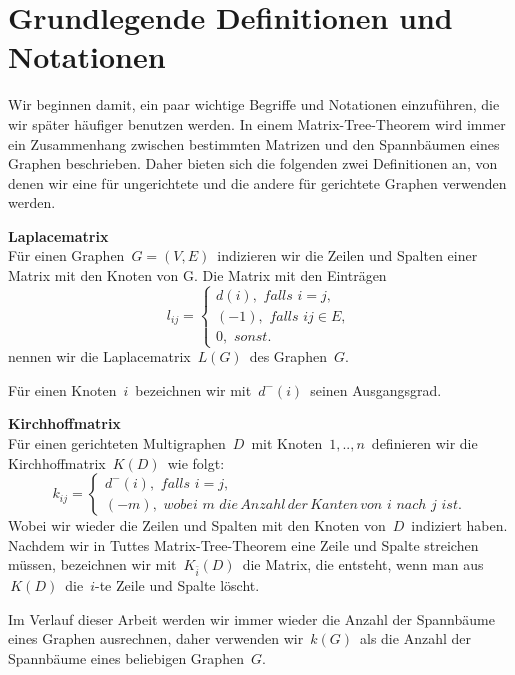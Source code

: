 \section{Grundlegende Definitionen und Notationen}
Wir beginnen damit, ein paar wichtige Begriffe und Notationen einzuführen, die wir später häufiger benutzen werden.
In einem Matrix-Tree-Theorem wird immer ein Zusammenhang zwischen bestimmten Matrizen und den Spannbäumen eines Graphen beschrieben. Daher bieten sich die folgenden zwei Definitionen an, von denen wir eine für ungerichtete und die andere für gerichtete Graphen verwenden werden.
\begin{Df}\textbf{Laplacematrix}\\
Für einen Graphen $\,G=(V,E)\,$ indizieren wir die Zeilen und Spalten einer Matrix mit den Knoten von G. Die Matrix mit den Einträgen
$$
l_{ij}=
\begin{cases}
 d(i),\, \, falls\,\, i=j,\\
 (-1), \, \, falls \,\, ij \in E,\\
 0, \,\, sonst.
\end{cases}
$$
nennen wir die Laplacematrix $\,L(G)\,$ des Graphen $\,G$.\;
\end{Df}
Für einen Knoten $\,i\,$ bezeichnen wir mit $\,d^{-}(i)\,$ seinen Ausgangsgrad.
\begin{Df}\textbf{Kirchhoffmatrix}\\
 Für einen gerichteten Multigraphen $\,D\,$ mit Knoten $\,1,..,n\,$ definieren wir die Kirchhoffmatrix $\,K(D)\,$ wie folgt:\\
$$
k_{ij}=
\begin{cases}
 d^{-}(i),\, \, falls\,\, i=j,\\
 (-m), \, \, wobei \,\, m \,\, die\, Anzahl\, der\, Kanten\, von\,\, i\,\, nach \,\,j\,\, ist.
\end{cases}
$$
Wobei wir wieder die Zeilen und Spalten mit den Knoten von $\,D\,$ indiziert haben.\\
Nachdem wir in Tuttes Matrix-Tree-Theorem eine Zeile und Spalte streichen müssen, bezeichnen wir mit $\,K_{\bar{i}}(D)\,$ die Matrix, die entsteht, wenn man aus $\,K(D)\,$ die $\,i$-te Zeile und Spalte löscht.
\end{Df}
Im Verlauf dieser Arbeit werden wir immer wieder die Anzahl der Spannbäume eines Graphen ausrechnen, daher verwenden wir $\,\mathit{k}(G)\,$ als die Anzahl der Spannbäume eines beliebigen Graphen $\,G$.\;
